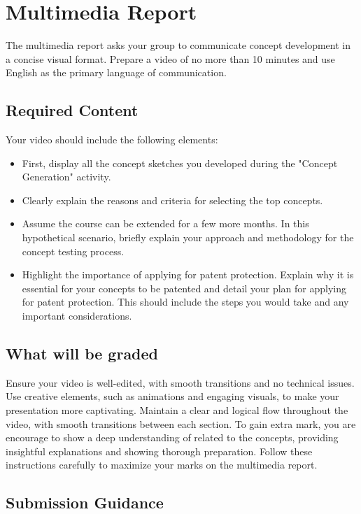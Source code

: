\section{Multimedia Report}

The multimedia report asks your group to communicate concept development in a concise visual format. Prepare a video of no more than 10 minutes and use English as the primary language of communication.

\subsection{Required Content}

Your video should include the following elements:
\begin{itemize}
    \item First, display all the concept sketches you developed during the "Concept Generation" activity.
    \item  Clearly explain the reasons and criteria for selecting the top concepts. 
    \item Assume the course can be extended for a few more months. In this hypothetical scenario, briefly explain your approach and methodology for the concept testing process. 
    \item Highlight the importance of applying for patent protection. Explain why it is essential for your concepts to be patented and detail your plan for applying for patent protection. This should include the steps you would take and any important considerations.
\end{itemize}

\subsection{What will be graded}

Ensure your video is well-edited, with smooth transitions and no technical issues. Use creative
elements, such as animations and engaging visuals, to make your presentation more captivating.
Maintain a clear and logical flow throughout the video, with smooth transitions between each
section. To gain extra mark, you are encourage to show a deep understanding of related to the concepts,
providing insightful explanations and showing thorough preparation. Follow these instructions
carefully to maximize your marks on the multimedia report.

\subsection{Submission Guidance}

